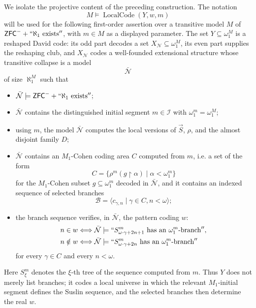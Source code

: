 \documentclass[a4paper,11pt]{article}
\newcommand{\ZFC}{\mathsf{ZFC}}
\begin{document}
We isolate the projective content of the preceding construction.  The notation
\[
   M\models\operatorname{LocalCode}(Y,w,m)
\]
will be used for the following first-order assertion over a transitive model $M$ of $\ZFC^-+``\aleph_1\text{ exists}''$, with $m\in M$ as a displayed parameter.  The set $Y\subseteq\omega_1^M$ is a reshaped David code: its odd part decodes a set $X_{\mathcal N}\subseteq\omega_1^M$, its even part supplies the reshaping club, and $X_{\mathcal N}$ codes a well-founded extensional structure whose transitive collapse is a model
\[
   \bar{\mathcal N}
\]
of size $\aleph_1^M$ such that
\begin{itemize}
   \item $\bar{\mathcal N}\models\ZFC^-+``\aleph_1\text{ exists}''$;
   \item $\bar{\mathcal N}$ contains the distinguished initial segment $m\in\mathcal I$ with $\omega_1^m=\omega_1^M$;
   \item using $m$, the model $\bar{\mathcal N}$ computes the local versions of $\vec S$, $\rho$, and the almost disjoint family $D$;
   \item $\bar{\mathcal N}$ contains an $M_1$-Cohen coding area $C$ computed from $m$, i.e. a set of the form
   \[
      C=\{\rho^m(g\upharpoonright\alpha)\mid \alpha<\omega_1^m\}
   \]
   for the $M_1$-Cohen subset $g\subseteq\omega_1^m$ decoded in $\bar{\mathcal N}$, and it contains an indexed sequence of selected branches
   \[
      \mathcal B=\langle c_{\gamma,n}\mid \gamma\in C,
         n<\omega\rangle;
   \]
   \item the branch sequence verifies, in $\bar{\mathcal N}$, the pattern coding $w$:
   \begin{align*}
      n\in w
      &\Longleftrightarrow
      \bar{\mathcal N}\models
      ``S^m_{\omega\cdot\gamma+2n+1}
        \text{ has an }\omega_1^m\text{-branch}'',\\
      n\notin w
      &\Longleftrightarrow
      \bar{\mathcal N}\models
      ``S^m_{\omega\cdot\gamma+2n}
        \text{ has an }\omega_1^m\text{-branch}''
   \end{align*}
   for every $\gamma\in C$ and every $n<\omega$.
\end{itemize}
Here $S^m_\xi$ denotes the $\xi$-th tree of the sequence computed from $m$.  Thus $Y$ does not merely list branches; it codes a local universe in which the relevant $M_1$-initial segment defines the Suslin sequence, and the selected branches then determine the real $w$.
\end{document}

